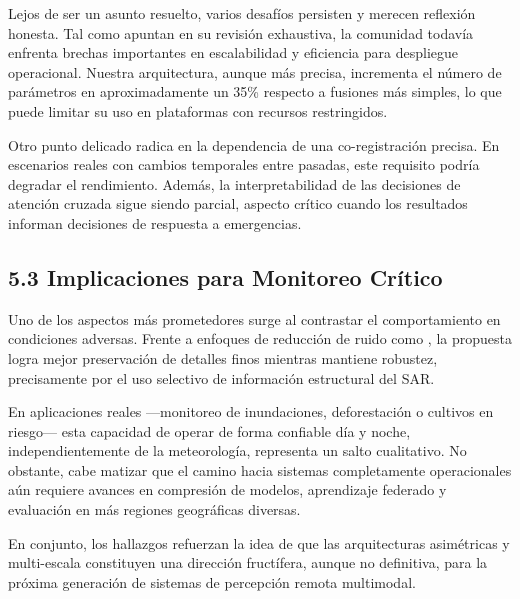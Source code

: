 Lejos de ser un asunto resuelto, varios desafíos persisten y merecen reflexión honesta. Tal como apuntan \cite{Li2022Deep} en su revisión exhaustiva, la comunidad todavía enfrenta brechas importantes en escalabilidad y eficiencia para despliegue operacional. Nuestra arquitectura, aunque más precisa, incrementa el número de parámetros en aproximadamente un 35\% respecto a fusiones más simples, lo que puede limitar su uso en plataformas con recursos restringidos.

Otro punto delicado radica en la dependencia de una co-registración precisa. En escenarios reales con cambios temporales entre pasadas, este requisito podría degradar el rendimiento. Además, la interpretabilidad de las decisiones de atención cruzada sigue siendo parcial, aspecto crítico cuando los resultados informan decisiones de respuesta a emergencias.

\subsection{5.3 Implicaciones para Monitoreo Crítico}

Uno de los aspectos más prometedores surge al contrastar el comportamiento en condiciones adversas. Frente a enfoques de reducción de ruido como \cite{Liu2025NCDFF}, la propuesta logra mejor preservación de detalles finos mientras mantiene robustez, precisamente por el uso selectivo de información estructural del SAR.

En aplicaciones reales —monitoreo de inundaciones, deforestación o cultivos en riesgo— esta capacidad de operar de forma confiable día y noche, independientemente de la meteorología, representa un salto cualitativo. No obstante, cabe matizar que el camino hacia sistemas completamente operacionales aún requiere avances en compresión de modelos, aprendizaje federado y evaluación en más regiones geográficas diversas.

En conjunto, los hallazgos refuerzan la idea de que las arquitecturas asimétricas y multi-escala constituyen una dirección fructífera, aunque no definitiva, para la próxima generación de sistemas de percepción remota multimodal.